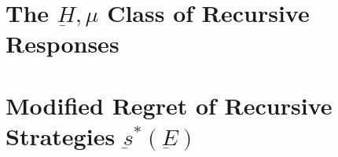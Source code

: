 \documentclass[11pt]{article}
\theoremstyle{boldStyle}
\begin{document}
\section{The $\underbar{H}, \mu$ Class of Recursive Responses}





\newpage
\section{Modified Regret of Recursive Strategies $\underbar{s}^*(\underbar{E})$}





\newpage
\end{document}
